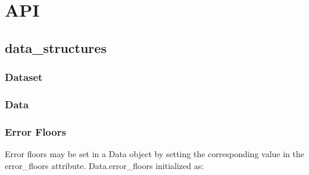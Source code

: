 \documentclass[letterpaper,10pt,english]{sphinxmanual}
\begin{document}
\chapter{API}
\label{\detokenize{index:api}}

\section{data\_structures}
\label{\detokenize{content/api_core/data_structures:data-structures}}\label{\detokenize{content/api_core/data_structures::doc}}

\subsection{Dataset}
\label{\detokenize{content/api_core/data_structures:dataset}}\label{\detokenize{content/api_core/data_structures:id1}}

\subsection{Data}
\label{\detokenize{content/api_core/data_structures:data}}\label{\detokenize{content/api_core/data_structures:id2}}

\subsection{Error Floors}
\label{\detokenize{content/api_core/data_structures:error-floors}}\label{\detokenize{content/api_core/data_structures:id3}}
Error floors may be set in a Data object by setting the corresponding value in the error\_floors attribute.
Data.error\_floors initialized as:

\begin{sphinxVerbatim}[commandchars=\\\{\}]
   
                  
                  
                  
                  
\end{sphinxVerbatim}
\end{document}
